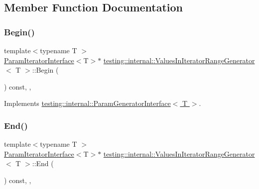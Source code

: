 \subsection{Member Function Documentation}
\mbox{\label{classtesting_1_1internal_1_1ValuesInIteratorRangeGenerator_a71ffed6f1deba05f11c9d45f6ab5b85d}} 
\subsubsection{\texorpdfstring{Begin()}{Begin()}}
{\footnotesize\ttfamily template$<$typename T $>$ \\
\hyperlink{classtesting_1_1internal_1_1ParamIteratorInterface}{Param\+Iterator\+Interface}$<$T$>$$\ast$ \hyperlink{classtesting_1_1internal_1_1ValuesInIteratorRangeGenerator}{testing\+::internal\+::\+Values\+In\+Iterator\+Range\+Generator}$<$ T $>$\+::Begin (\begin{DoxyParamCaption}{ }\end{DoxyParamCaption}) const\hspace{0.3cm}{\ttfamily [inline]}, {\ttfamily [override]}, {\ttfamily [virtual]}}



Implements \hyperlink{classtesting_1_1internal_1_1ParamGeneratorInterface_ae1de83b16fe9a53c67778a026c6a9569}{testing\+::internal\+::\+Param\+Generator\+Interface$<$ T $>$}.

\mbox{\label{classtesting_1_1internal_1_1ValuesInIteratorRangeGenerator_a298cfb66a90b1a39c0cea3ca7ae1ece1}} 
\subsubsection{\texorpdfstring{End()}{End()}}
{\footnotesize\ttfamily template$<$typename T $>$ \\
\hyperlink{classtesting_1_1internal_1_1ParamIteratorInterface}{Param\+Iterator\+Interface}$<$T$>$$\ast$ \hyperlink{classtesting_1_1internal_1_1ValuesInIteratorRangeGenerator}{testing\+::internal\+::\+Values\+In\+Iterator\+Range\+Generator}$<$ T $>$\+::End (\begin{DoxyParamCaption}{ }\end{DoxyParamCaption}) const\hspace{0.3cm}{\ttfamily [inline]}, {\ttfamily [override]}, {\ttfamily [virtual]}}



